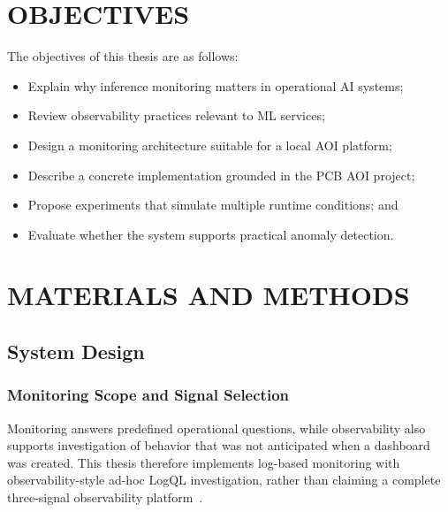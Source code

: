 \documentclass[12pt,a4paper]{article}
\begin{document}
\section{OBJECTIVES}

The objectives of this thesis are as follows:
\begin{itemize}
    \item Explain why inference monitoring matters in operational AI systems;
    \item Review observability practices relevant to ML services;
    \item Design a monitoring architecture suitable for a local AOI platform;
    \item Describe a concrete implementation grounded in the PCB AOI project;
    \item Propose experiments that simulate multiple runtime conditions; and
    \item Evaluate whether the system supports practical anomaly detection.
\end{itemize}


\section{MATERIALS AND METHODS}
\subsection{System Design}

\subsubsection{Monitoring Scope and Signal Selection}\label{subsubsec:signal_selection}
Monitoring answers predefined operational questions, while observability also
supports investigation of behavior that was not anticipated when a dashboard
was created. This thesis therefore implements log-based monitoring with
observability-style ad-hoc LogQL investigation, rather than claiming a complete
three-signal observability platform~\cite{majors2022observability,sridharan2018distributed}.
\end{document}
